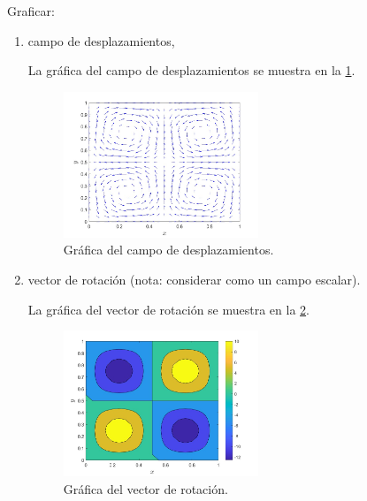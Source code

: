 \documentclass[./../main.tex]{subfiles}
\begin{document}
    \pagebreak
    Graficar:

    \begin{enumerate}[resume, label=\arabic*)]
        \item campo de desplazamientos,
        
        La gráfica del campo de desplazamientos se muestra en la \cref{fig:displacement_field}.

        \begin{figure}[htb]
            \centering
            \includegraphics[width=0.55\textwidth]{campo-desplazamientos.jpg}
            \caption{Gráfica del campo de desplazamientos.}
            \label{fig:displacement_field}
        \end{figure}
        
        \item vector de rotación (nota: considerar como un campo escalar).
        
        La gráfica del vector de rotación se muestra en la \cref{fig:rotation_vector}.

        \begin{figure}[htb]
            \centering
            \includegraphics[width=0.55\textwidth]{vector-rotacion.jpg}
            \caption{Gráfica del vector de rotación.}
            \label{fig:rotation_vector}
        \end{figure}
    \end{enumerate}
\end{document}
